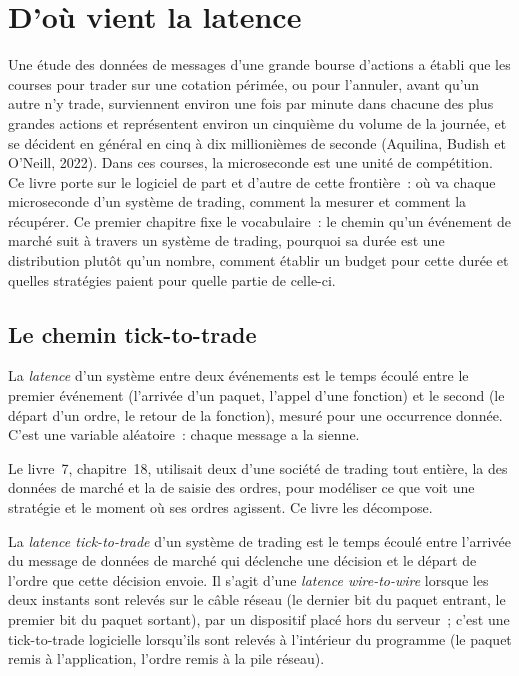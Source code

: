 \chapter{D'où vient la latence}\label{ch:ll:where-latency-comes-from}

Une étude des données de messages d'une grande bourse d'actions a établi que les courses pour trader sur une cotation périmée, ou pour l'annuler,
avant qu'un autre n'y trade, surviennent environ une fois par minute dans chacune des plus grandes actions et représentent environ un
cinquième du volume de la journée, et se décident en général en cinq à dix millionièmes de seconde (Aquilina, Budish et
O'Neill, 2022). Dans ces courses, la microseconde est une unité de compétition. Ce livre porte sur le logiciel de part et d'autre
de cette frontière~: où va chaque microseconde d'un système de trading, comment la mesurer et comment la récupérer. Ce premier chapitre
fixe le vocabulaire~: le chemin qu'un événement de marché suit à travers un système de trading, pourquoi sa durée est une
distribution plutôt qu'un nombre, comment établir un budget pour cette durée et quelles stratégies paient pour quelle partie de celle-ci.

\section{Le chemin tick-to-trade}

\begin{definition}[Latence]\label{def:ll:where-latency-comes-from:latency}
La \emph{latence} d'un système entre deux événements est le temps écoulé entre le premier événement
(l'arrivée d'un paquet, l'appel d'une fonction) et le second (le départ d'un ordre, le retour de la fonction), mesuré pour une occurrence donnée.
C'est une variable aléatoire~: chaque message a la sienne.
\end{definition}

Le livre~7, chapitre~18, utilisait deux  d'une société de trading tout entière, la  des données de marché et
la  de saisie des ordres, pour modéliser ce que voit une stratégie et le moment où ses ordres agissent. Ce livre les décompose.

\begin{definition}\label{def:ll:where-latency-comes-from:t2t}
La \emph{latence tick-to-trade} d'un système de trading est le temps écoulé entre l'arrivée du message
de données de marché qui déclenche une décision et le départ de l'ordre que cette décision envoie. Il s'agit d'une
\emph{latence wire-to-wire} lorsque les deux instants sont relevés
sur le câble réseau (le dernier bit du paquet entrant, le premier bit du paquet sortant), par un dispositif placé hors du serveur~;
c'est une  tick-to-trade logicielle lorsqu'ils sont relevés à l'intérieur du programme
(le paquet remis à l'application, l'ordre remis à la pile réseau).
\end{definition}

